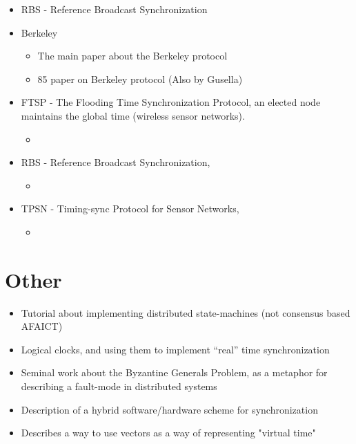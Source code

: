 \documentclass[a4paper,12pt]{article}
\begin{document}
\begin{itemize}
\item \cite{ElsonGirodEstrin02} RBS - Reference Broadcast Synchronization
\item Berkeley
  \begin{itemize}
  \item \cite{Gusella89} The main paper about the Berkeley protocol
  \item \cite{GusellaZatti85} 85 paper on Berkeley protocol (Also by Gusella)
  \end{itemize}
\item FTSP - The Flooding Time Synchronization Protocol, an elected node maintains the global time (wireless sensor networks).
    \begin{itemize}
        \item \cite{Maroti04} 
    \end{itemize}
\item RBS - Reference Broadcast Synchronization, 
    \begin{itemize}
        \item \cite{Elson02}
    \end{itemize}
\item TPSN - Timing-sync Protocol for Sensor Networks,
    \begin{itemize}
        \item 
    \end{itemize}
\end{itemize}



\section{Other}

\begin{itemize}
\item \cite{Schneider90} Tutorial about implementing distributed state-machines (not consensus based AFAICT)
\item \cite{Lamport78} Logical clocks, and using them to implement ``real'' time synchronization
\item \cite{Lamport82} Seminal work about the Byzantine Generals Problem, as a metaphor for describing a fault-mode in distributed systems
\item \cite{Ramanathan90} Description of a hybrid software/hardware scheme for synchronization
\item \cite{Mattern89} Describes a way to use vectors as a way of representing "virtual time"
\end{itemize}

\printbibliography
\end{document}
